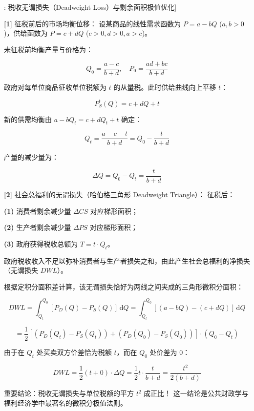 \documentclass[11pt,a4paper,UTF8]{ctexart}
\begin{document}
\begin{thmbox}[模型[7]: 税收无谓损失（Deadweight Loss）与剩余面积极值优化]

\textbf{[1]} 征税前后的市场均衡位移：
设某商品的线性需求函数为 $P = a - b Q$ ($a, b > 0$)，供给函数为 $P = c + d Q$ ($c > 0, d > 0, a > c$)。

未征税前均衡产量与价格为：


\begin{equation*}
Q_0 = \frac{a - c}{b + d}, \quad P_0 = \frac{a d + b c}{b + d}
\end{equation*}


政府对每单位商品征收单位税额为 $t$ 的从量税。此时供给曲线向上平移 $t$：


\begin{equation*}
P_S^t(Q) = c + d Q + t
\end{equation*}


新的供需均衡由 $a - b Q_t = c + d Q_t + t$ 确定：


\begin{equation*}
Q_t = \frac{a - c - t}{b + d} = Q_0 - \frac{t}{b + d}
\end{equation*}


产量的减少量为：


\begin{equation*}
\Delta Q = Q_0 - Q_t = \frac{t}{b + d}
\end{equation*}


\textbf{[2]} 社会总福利的无谓损失（哈伯格三角形 Deadweight Triangle）：
征税后：

\textbf{(1)}  消费者剩余减少量 $\Delta CS$ 对应梯形面积；

\textbf{(2)}  生产者剩余减少量 $\Delta PS$ 对应梯形面积；

\textbf{(3)}  政府获得税收总额为 $T = t \cdot Q_t$。

政府税收收入不足以弥补消费者与生产者损失之和，由此产生社会总福利的净损失（无谓损失 $DWL$）。

根据定积分面积差计算，该无谓损失恰好为两线之间夹成的三角形微积分面积：


\begin{equation*}
DWL = \int_{Q_t}^{Q_0} [P_D(Q) - P_S(Q)]\,\mathrm{d}Q = \int_{Q_t}^{Q_0} [(a - b Q) - (c + d Q)]\,\mathrm{d}Q
\end{equation*}



\begin{equation*}
= \frac{1}{2} [(P_D(Q_t) - P_S(Q_t)) + (P_D(Q_0) - P_S(Q_0))] \cdot (Q_0 - Q_t)
\end{equation*}


由于在 $Q_t$ 处买卖双方价差恰为税额 $t$，而在 $Q_0$ 处价差为 $0$：


\begin{equation*}
DWL = \frac{1}{2} (t + 0) \cdot \Delta Q = \frac{1}{2} t \cdot \frac{t}{b + d} = \frac{t^2}{2(b + d)}
\end{equation*}


重要结论：\textit{}税收无谓损失与单位税额的平方 $t^2$ 成正比！\textit{} 这一结论是公共财政学与福利经济学中最著名的微积分极值法则。
\end{thmbox}
\end{document}
